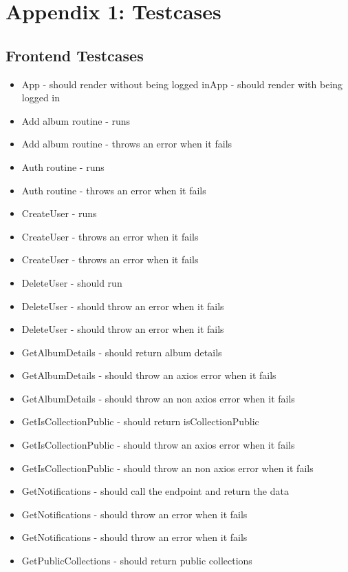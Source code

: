 \chapter{Appendix 1: Testcases} \label{apd:testcases}

\section{Frontend Testcases} \label{sec:frontend_testcases}
\begin{multicols}{1}
    \begin{itemize}
        \item App - should render without being logged inApp - should render with being logged in
\item Add album routine - runs
\item Add album routine - throws an error when it fails
\item Auth routine - runs
\item Auth routine - throws an error when it fails
\item CreateUser - runs
\item CreateUser - throws an error when it fails
\item CreateUser - throws an error when it fails
\item DeleteUser - should run
\item DeleteUser - should throw an error when it fails
\item DeleteUser - should throw an error when it fails
\item GetAlbumDetails - should return album details
\item GetAlbumDetails - should throw an axios error when it fails
\item GetAlbumDetails - should throw an non axios error when it fails
\item GetIsCollectionPublic - should return isCollectionPublic
\item GetIsCollectionPublic - should throw an axios error when it fails
\item GetIsCollectionPublic - should throw an non axios error when it fails
\item GetNotifications - should call the endpoint and return the data
\item GetNotifications - should throw an error when it fails
\item GetNotifications - should throw an error when it fails
\item GetPublicCollections - should return public collections

\end{itemize}
\end{multicols}
